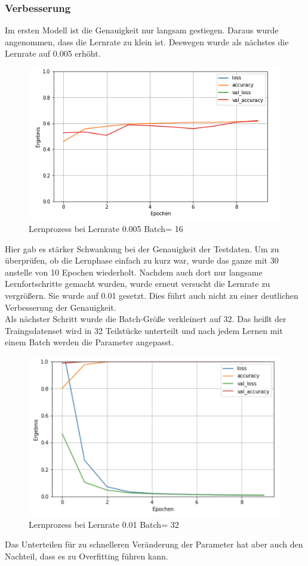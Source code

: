 \subsubsection{Verbesserung}
Im ersten Modell ist die Genauigkeit nur langsam gestiegen. Daraus wurde angenommen, dass die Lernrate zu klein ist. Deswegen wurde als nächstes die Lernrate auf 0.005 erhöht. 
\begin{figure}[h]
\centering
\includegraphics[scale=0.5]{pic/achse00516}
\caption{Lernprozess bei Lernrate 0.005 Batch= 16}
\end{figure}
Hier gab es stärker Schwankung bei der Genauigkeit der Testdaten.  Um zu überprüfen, ob die Lernphase einfach zu kurz war, wurde das ganze mit 30 anstelle von 10 Epochen wiederholt.
Nachdem auch dort nur langsame Lernfortschritte gemacht wurden,  wurde erneut versucht die Lernrate zu vergrößern.  Sie wurde auf 0.01 gesetzt.  Dies führt auch nicht zu einer deutlichen Verbesserung der Genauigkeit.\\
Als nächster Schritt wurde die Batch-Größe verkleinert auf 32.  Das heißt der Traingsdatenset wird in 32 Teilstücke unterteilt und nach jedem Lernen mit einem Batch werden die Parameter angepasst. 
\begin{figure}[h]
\centering
\includegraphics[scale=0.5]{pic/achsen00132}
\caption{Lernprozess bei Lernrate 0.01 Batch= 32}
\end{figure}
Das Unterteilen für zu schnelleren Veränderung der Parameter hat aber auch den Nachteil, dass es zu Overfitting führen kann.




